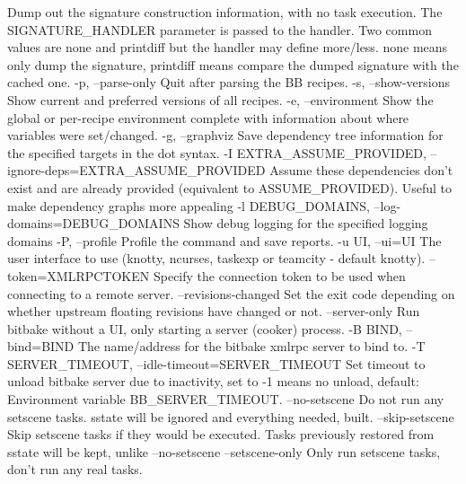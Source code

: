 \begin{pyglist}
                        Dump out the signature construction information, with
                        no task execution. The SIGNATURE_HANDLER parameter is
                        passed to the handler. Two common values are none and
                        printdiff but the handler may define more/less. none
                        means only dump the signature, printdiff means compare
                        the dumped signature with the cached one.
  -p, --parse-only      Quit after parsing the BB recipes.
  -s, --show-versions   Show current and preferred versions of all recipes.
  -e, --environment     Show the global or per-recipe environment complete
                        with information about where variables were
                        set/changed.
  -g, --graphviz        Save dependency tree information for the specified
                        targets in the dot syntax.
  -I EXTRA_ASSUME_PROVIDED, --ignore-deps=EXTRA_ASSUME_PROVIDED
                        Assume these dependencies don't exist and are already
                        provided (equivalent to ASSUME_PROVIDED). Useful to
                        make dependency graphs more appealing
  -l DEBUG_DOMAINS, --log-domains=DEBUG_DOMAINS
                        Show debug logging for the specified logging domains
  -P, --profile         Profile the command and save reports.
  -u UI, --ui=UI        The user interface to use (knotty, ncurses, taskexp or
                        teamcity - default knotty).
  --token=XMLRPCTOKEN   Specify the connection token to be used when
                        connecting to a remote server.
  --revisions-changed   Set the exit code depending on whether upstream
                        floating revisions have changed or not.
  --server-only         Run bitbake without a UI, only starting a server
                        (cooker) process.
  -B BIND, --bind=BIND  The name/address for the bitbake xmlrpc server to bind
                        to.
  -T SERVER_TIMEOUT, --idle-timeout=SERVER_TIMEOUT
                        Set timeout to unload bitbake server due to
                        inactivity, set to -1 means no unload, default:
                        Environment variable BB_SERVER_TIMEOUT.
  --no-setscene         Do not run any setscene tasks. sstate will be ignored
                        and everything needed, built.
  --skip-setscene       Skip setscene tasks if they would be executed. Tasks
                        previously restored from sstate will be kept, unlike
                        --no-setscene
  --setscene-only       Only run setscene tasks, don't run any real tasks.

\end{pyglist}

